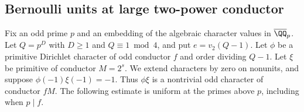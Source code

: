 \documentclass[a4paper,11pt]{article}
\theoremstyle{definition}
\theoremstyle{remark}
\numberwithin{equation}{section}
\begin{document}
\subsection{Bernoulli units at large two-power conductor}\label{nav:III-22}
\label{sec:fourier145}

Fix an odd prime \(p\) and an embedding of the algebraic character
values in \(\overline{\QQ}_p\). Let \(Q=p^D\) with \(D\ge1\) and
\(Q\equiv1\bmod4\), and put \(e=v_2(Q-1)\). Let \(\phi\) be a
primitive Dirichlet character of odd conductor \(f\) and order
dividing \(Q-1\). Let \(\xi\) be primitive of conductor \(M=2^s\).
We extend characters by zero on nonunits, and suppose
\(\phi(-1)\xi(-1)=-1\). Thus \(\phi\xi\) is a nontrivial odd
character of conductor \(fM\). The following estimate is uniform
at the primes above \(p\), including when \(p\mid f\).
\end{document}
